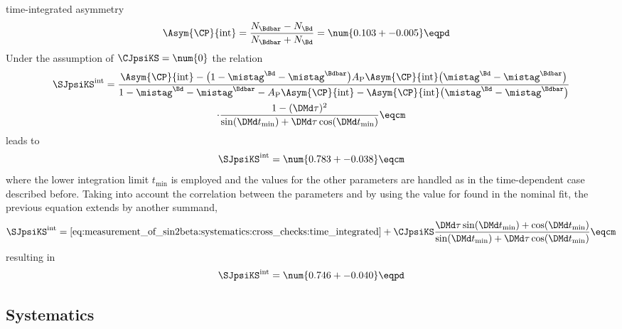 time-integrated \CP asymmetry
%
\begin{equation}\label{eq:measurement_of_sin2beta:systematics:cross_checks:time_integrated:cp_asym}
  \begin{split}
    \Asym{\CP}{\text{int}} &= \frac{N_{\Bdbar} - N_{\Bd}}{N_{\Bdbar} + N_{\Bd}} = \num{0.103 +- 0.005} \eqpd
  \end{split}
\end{equation}
%
Under the \SM assumption of $\CJpsiKS = \num{0}$ the relation
%
\begin{multline}\label{eq:measurement_of_sin2beta:systematics:cross_checks:time_integrated}
  \SJpsiKS^{\text{int}} = 
  \frac{ \Asym{\CP}{\text{int}} - \bigl( 1 - \mistag^{\Bd} - \mistag^{\Bdbar}\bigr) A_{\text{P}} \Asym{\CP}{\text{int}} \bigl( \mistag^{\Bd} - \mistag^{\Bdbar} \bigr)}
    {1 - \mistag^{\Bd} - \mistag^{\Bdbar} - A_{\text{P}} \Asym{\CP}{\text{int}} - \Asym{\CP}{\text{int}} \bigl( \mistag^{\Bd} - \mistag^{\Bdbar} \bigr) } \\
  \cdot\frac{1 - (\DMd \tau)^2}{ \sin (\DMd t_{\text{min}}) + \DMd \tau \cos (\DMd t_{\text{min}})} \eqcm
\end{multline}
%
leads to 
%
\begin{equation*}
  \SJpsiKS^{\text{int}} = \num{0.783 +- 0.038} \eqcm
\end{equation*}
%
where the lower integration limit $t_{\text{min}}$ is employed and the values
for the other parameters are handled as in the time-dependent case described
before. Taking into account the correlation between the \CP parameters \SJpsiKS
and \CJpsiKS by using the value for \CJpsiKS found in the nominal fit, the
previous equation extends by another summand,
%
\begin{equation}
  \SJpsiKS^{\text{int}} = \text{\cref{eq:measurement_of_sin2beta:systematics:cross_checks:time_integrated}} 
  + \CJpsiKS \frac{\DMd \tau \sin (\DMd t_{\text{min}}) + \cos (\DMd t_{\text{min}})}{\sin (\DMd t_{\text{min}}) + \DMd \tau \cos (\DMd t_{\text{min}})} \eqcm
\end{equation}
%
resulting in
%
\begin{equation*}
  \SJpsiKS^{\text{int}} = \num{0.746 +- 0.040} \eqpd
\end{equation*}
%

\subsection{Systematics}
\label{sec:measurement_of_sin2beta:systematics:systematics}

